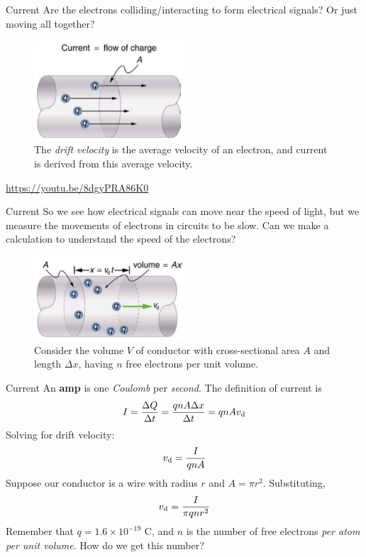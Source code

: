 \documentclass{beamer}
\begin{document}
\begin{frame}{Current}
\small
Are the electrons colliding/interacting to form electrical signals?  Or just moving all together?
\begin{figure}
\includegraphics[width=0.5\textwidth]{figures/current1.png}
\caption{\label{fig:current1} The \textit{drift velocity} is the average velocity of an electron, and current is derived from this average velocity.}
\end{figure}
\url{https://youtu.be/8dgyPRA86K0}
\end{frame}

\begin{frame}{Current}
So we see how electrical signals can move near the speed of light, but we measure the movements of electrons in circuits to be slow.  Can we make a calculation to understand the speed of the electrons? \\ \vspace{0.5cm}
\begin{figure}
\includegraphics[width=0.5\textwidth]{figures/current3.png}
\caption{\label{fig:current3} Consider the volume $V$ of conductor with cross-sectional area $A$ and length $\Delta x$, having $n$ free electrons per unit volume.}
\end{figure}
\end{frame}

\begin{frame}{Current}
An \textbf{amp} is one \textit{Coulomb} per \textit{second}.  The definition of current is
\begin{equation}
I = \frac{\Delta Q}{\Delta t} = \frac{qnA\Delta x}{\Delta t} = q n A v_{\rm d}
\end{equation}
Solving for drift velocity:
\begin{equation}
v_{\rm d} = \frac{I}{q n A}
\end{equation}
Suppose our conductor is a wire with radius $r$ and $A = \pi r^2$.  Substituting,
\begin{equation}
v_{\rm d} = \frac{I}{\pi q n r^2}
\end{equation}
Remember that $q = 1.6 \times 10^{-19}$ C, and $n$ is the number of free electrons \textit{per atom per unit volume}.  How do we get this number?
\end{frame}
\end{document}
